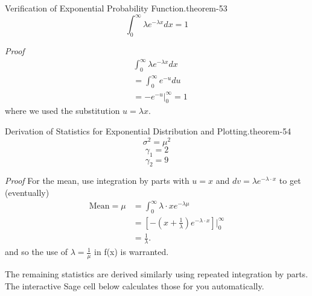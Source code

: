 \documentclass[10pt,]{book}
\makeatletter
\renewcommand*{\proofname}{Proof}
\renewenvironment{proof}[1][\proofname]{\par
  \pushQED{\qed}%
  \normalfont \topsep6\p@\@plus6\p@\relax
  \trivlist
  \item\relax
    {\itshape
    #1\@addpunct{.}}\hspace\labelsep\ignorespaces
}{%
  \popQED\endtrivlist\@endpefalse
}
\numberwithin{equation}{section}
\makeatother
\begin{document}
\par
\hypertarget{p-1081}{}%
\begin{theorem}{Verification of Exponential Probability Function.}{}{theorem-53}%
\hypertarget{p-1082}{}%
%
\begin{equation*}
\int_0^{\infty} \lambda e^{-\lambda x} dx = 1
\end{equation*}
%
\end{theorem}
\begin{proof}\hypertarget{proof-56}{}
\hypertarget{p-1083}{}%
%
\begin{align*}
& \int_0^{\infty} \lambda e^{-\lambda x} dx\\
& = \int_0^{\infty} e^{-u} du\\
& = -e^{-u} \big |_0^{\infty} = 1
\end{align*}
where we used the substitution \(u = \lambda x\).%
\end{proof}
%
\par
\hypertarget{p-1084}{}%
\begin{theorem}{Derivation of Statistics for Exponential Distribution and Plotting.}{}{theorem-54}%
\hypertarget{p-1085}{}%
%
\begin{equation*}
\sigma^2 = \mu^2
\end{equation*}
%
\begin{equation*}
\gamma_1 = 2
\end{equation*}
%
\begin{equation*}
\gamma_2 = 9
\end{equation*}
%
\end{theorem}
\begin{proof}\hypertarget{proof-57}{}
\hypertarget{p-1086}{}%
For the mean, use integration by parts with \(u = x\) and \(dv = \lambda e^{-\lambda \cdot x}\) to get (eventually)%
\begin{align*}
\text{Mean} = \mu & = \int_0^{\infty} \lambda \cdot x  e^{-\lambda \mu} \\
& = [ -(x+\frac{1}{\lambda}) e^{-\lambda \cdot x} ] \big |_0^{\infty} \\
& = \frac{1}{\lambda}.
\end{align*}
and so the use of \(\lambda = \frac{1}{\mu}\) in f(x) is warranted.%
\par
\hypertarget{p-1087}{}%
The remaining statistics are derived similarly using repeated integration by parts. The interactive Sage cell below calculates those for you automatically.%
\end{proof}
%
\par
\hypertarget{p-1088}{}%
\end{document}
